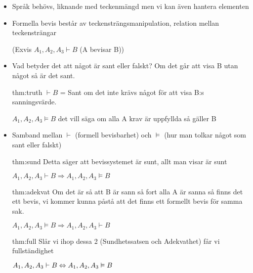 \begin{itemize}
  \item Språk behövs, liknande med teckenmängd men vi kan även hantera elementen
  \item Formella bevis består av teckensträngsmanipulation, relation mellan teckensträngar\par(Exvis $A_1, A_2, A_3 \vdash B$ (A bevisar B))
  \item Vad betyder det att något är sant eller falskt? Om det går att visa B utan något så är det sant. 
    \par\bigskip

    \begin{theo}{thm:truth}
      $\vdash B$ = Sant om det inte krävs något för att visa B:s sanningsvärde.\par\bigskip

      $A_1, A_2, A_3 \vDash B$ det vill säga om alla A krav är uppfyllda så gäller B
    \end{theo}
    \par\bigskip

  \item Samband mellan $\vdash$ (formell bevisbarhet) och $\vDash$ (hur man tolkar något som sant eller falskt)
    \par\bigskip


    \begin{theo}[Sundhetssatsen]{thm:sund}
      Detta säger att bevissystemet är sunt, allt man visar är sunt
      \par\bigskip
      $A_1, A_2, A_3 \vdash B \Rightarrow A_1, A_2, A_3 \vDash B$
    \end{theo}
    \par\bigskip


    \begin{theo}[Adekvathet]{thm:adekvat}
      Om det är så att B är sann så fort alla A är sanna så finns det ett bevis, vi kommer kunna påstå att det finns ett formellt bevis för samma sak.
      \par\bigskip
      $A_1, A_2, A_3 \vDash B \Rightarrow A_1, A_2, A_3 \vdash B$
    \end{theo}
    \par\bigskip

    \begin{theo}[Fullständighet]{thm:full}
      Slår vi ihop dessa 2 (Sundhetssatsen och Adekvathet) får vi fullständighet
      \par\bigskip
      $A_1, A_2, A_3 \vdash B \Leftrightarrow A_1, A_2, A_3 \vDash B$
    \end{theo}

\end{itemize}

\newpage

